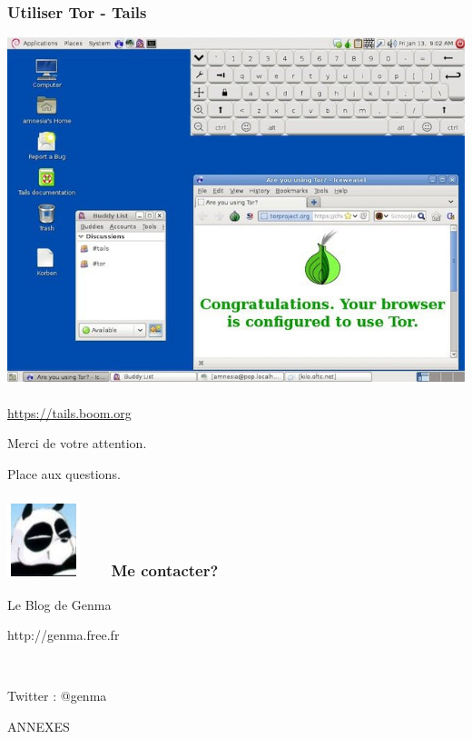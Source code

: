\documentclass{beamer}
\begin{document}
\begin{frame}
\frametitle{Utiliser Tor - Tails}
\begin{center}
\includegraphics[scale=0.3]{./images/tails.jpg}
\\~\\
\url{https://tails.boom.org}
\end{center}
\end{frame}

\begin{frame}
\Huge{\centerline{Merci de votre attention.}}
\Huge{\centerline{Place aux questions.}}
\end{frame}

\begin{frame}
\frametitle{\includegraphics[scale=0.4]{./images/Genma.jpg} \ \ \  Me contacter?}
\Huge{\centerline{Le Blog de Genma}}
\Huge{\centerline{http://genma.free.fr}}
\Huge{\centerline{~}}
\Huge{\centerline{Twitter : @genma}}
\end{frame}

\begin{frame}
\Huge{\centerline{ANNEXES}}
\end{frame}
\end{document}
